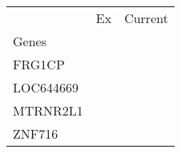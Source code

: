 \begin{tabular}{lcc}
\toprule
{} & Ex & Current \\
Genes     &    &         \\
\midrule
FRG1CP    &    &         \\
LOC644669 &    &         \\
MTRNR2L1  &    &         \\
ZNF716    &    &         \\
\bottomrule
\end{tabular}
